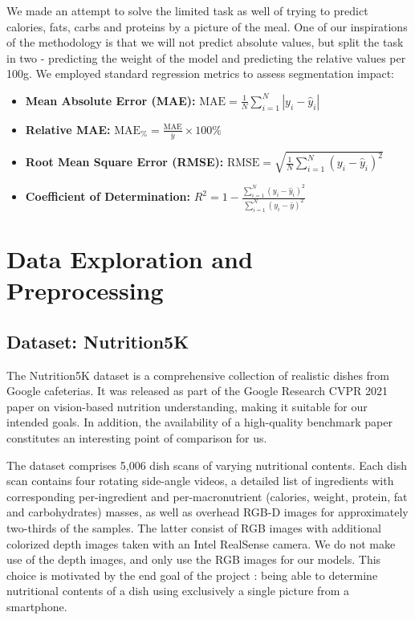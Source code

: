 \documentclass[a4paper]{article}
\begin{document}
        We made an attempt to solve the limited task as well of trying to predict calories, fats, carbs and proteins by a picture of the meal. One of our inspirations of the methodology \cite{thames2021nutrition5k} is that we will not predict absolute values, but split the task in two - predicting the weight of the model and predicting the relative values per 100g. 
        We employed standard regression metrics to assess segmentation impact:
        \begin{itemize}
            \item \textbf{Mean Absolute Error (MAE):} $\text{MAE} = \frac{1}{N}\sum_{i=1}^N |y_i - \hat{y}_i|$
            \item \textbf{Relative MAE:} $\text{MAE}_{\%} = \frac{\text{MAE}}{\bar{y}} \times 100\%$
            \item \textbf{Root Mean Square Error (RMSE):} $\text{RMSE} = \sqrt{\frac{1}{N}\sum_{i=1}^N (y_i - \hat{y}_i)^2}$
            \item \textbf{Coefficient of Determination:} $R^2 = 1 - \frac{\sum_{i=1}^N(y_i - \hat{y}_i)^2}{\sum_{i=1}^N(y_i - \bar{y})^2}$
        \end{itemize}

        \section{Data Exploration and Preprocessing}
        \subsection{Dataset: Nutrition5K}
            The Nutrition5K dataset \cite{thames2021nutrition5k} is a comprehensive collection of realistic dishes from Google cafeterias. It was released as part of the Google Research CVPR 2021 paper \cite{thames2021nutrition5k} on vision-based nutrition understanding, making it suitable for our intended goals. In addition, the availability of a high-quality benchmark paper constitutes an interesting point of comparison for us.
    
            The dataset comprises 5,006 dish scans of varying nutritional contents. Each dish scan contains four rotating side-angle videos, a detailed list of ingredients with corresponding per-ingredient and per-macronutrient (calories, weight, protein, fat and carbohydrates) masses, as well as overhead RGB-D images for approximately two-thirds of the samples. The latter consist of RGB images with additional colorized depth images taken with an Intel RealSense camera. We do not make use of the depth images, and only use the RGB images for our models. This choice is motivated by the end goal of the project : being able to determine nutritional contents of a dish using exclusively a single picture from a smartphone.
\end{document}
